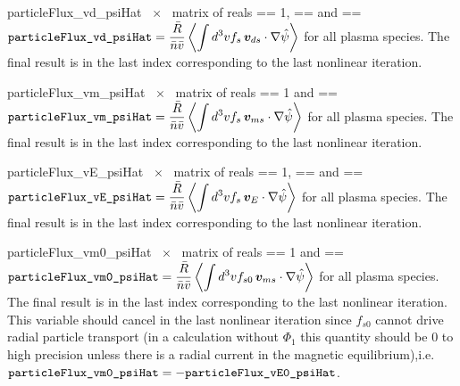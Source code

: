 \myhrule

{particleFlux_vd_psiHat}
{%
~$\times$~ matrix of reals}
{ == 1,  == \true and  == \true}
{$\displaystyle \text{\ttfamily particleFlux\_vd\_psiHat} = \frac{\bar{R}}{\bar{n} \bar{v}} \left\langle \int d^3v f_s \, \bm{v}_{ds} \cdot \nabla \hat{\psi}\right\rangle$ for all plasma species. The final result is in the last index corresponding to the last nonlinear iteration.}

\myhrule

{particleFlux_vm_psiHat}
{~$\times$~ matrix of reals}
{ == 1 and  == \true}
{$\displaystyle \text{\ttfamily particleFlux\_vm\_psiHat} = \frac{\bar{R}}{\bar{n} \bar{v}} \left\langle \int d^3v f_s \, \bm{v}_{ms} \cdot \nabla \hat{\psi}\right\rangle$ for all plasma species. The final result is in the last index corresponding to the last nonlinear iteration.}

\myhrule

{particleFlux_vE_psiHat}
{~$\times$~ matrix of reals}
{ == 1,  == \true and  == \true}
{$\displaystyle \text{\ttfamily particleFlux\_vE\_psiHat} = \frac{\bar{R}}{\bar{n} \bar{v}} \left\langle \int d^3v f_s \, \bm{v}_{E} \cdot \nabla \hat{\psi}\right\rangle$ for all plasma species. The final result is in the last index corresponding to the last nonlinear iteration.}

\myhrule

{particleFlux_vm0_psiHat}
{~$\times$~ matrix of reals}
{ == 1 and  == \true}
{$\displaystyle \text{\ttfamily particleFlux\_vm0\_psiHat} = \frac{\bar{R}}{\bar{n} \bar{v}} \left\langle \int d^3v f_{s0} \, \bm{v}_{ms} \cdot \nabla \hat{\psi}\right\rangle$ for all plasma species. The final result is in the last index corresponding to the last nonlinear iteration. This variable should cancel  in the last nonlinear iteration since $f_{s0}$ cannot drive radial particle transport (in a calculation without $\Phi_1$ this quantity should be 0 to high precision unless there is a radial current in the magnetic equilibrium),\newline i.e. $\displaystyle \text{\ttfamily particleFlux\_vm0\_psiHat} = - \text{\ttfamily particleFlux\_vE0\_psiHat}$.}

